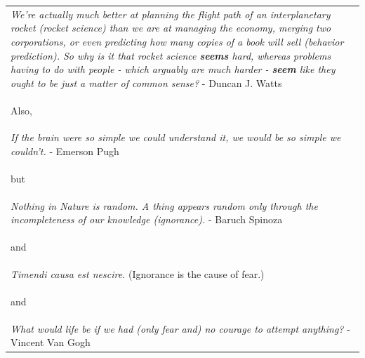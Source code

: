 \documentclass[hidelinks,11pt,a4paper]{report}
\begin{document}


\setcounter{page}{1}





\begin{table}[]
    \centering
    \begin{tabularx}{1\textwidth}{X}
        
        \textit{We're actually much better at planning the flight path of an interplanetary rocket (rocket science) than we are at managing the economy, merging two corporations, or even predicting how many copies of a book will sell (behavior prediction). So why is it that rocket science \textbf{seems} hard, whereas problems having to do with people - which arguably are much harder - \textbf{seem} like they ought to be just a matter of common sense?} - Duncan J. Watts\\

        \begin{center}
                Also,
        \end{center}\\


        \textit{If the brain were so simple we could understand it, we would be so simple we couldn't.} - Emerson Pugh\\
        
        
        
        \begin{center}
            but
        \end{center}\\
        
        \textit{Nothing in Nature is random. A thing appears random only through the incompleteness of our knowledge (ignorance).} - Baruch Spinoza\\

        \begin{center}
                and
        \end{center}\\
        
        \textit{Timendi causa est nescire.} (Ignorance is the cause of fear.)\\
        
        \begin{center}
                and
        \end{center}\\
        
        \textit{What would life be if we had (only fear and) no courage to attempt anything?} - Vincent Van Gogh\\
        
    \end{tabularx}
    
\end{table}
\end{document}
